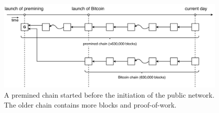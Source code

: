 \begin{figure}[hbt] \centering

    \includegraphics[width=12cm]{./images/premining_attack_bitcoin.pdf}

    \caption{ A premined chain started before the initiation of the public
    network. The older chain contains more blocks and proof-of-work.}

    \label{figure:premining_attack_bitcoin} \end{figure}

